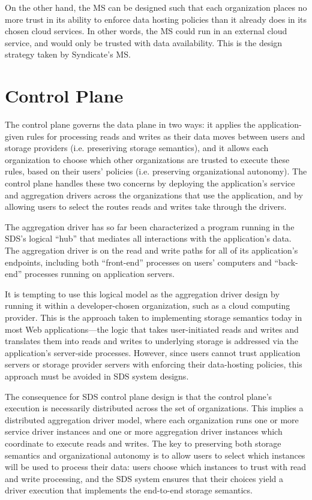 On the other hand, the MS can be designed such that each organization
places no more trust in its ability to enforce data hosting policies
than it already does in its chosen cloud services.  In other words, the
MS could run in an external cloud service, and would only be trusted
with data availability.  This is the design strategy taken by Syndicate's MS.

\section{Control Plane}

The control plane governs the data plane in two ways:  it applies
the application-given rules for processing reads and writes as their data moves
between users and storage providers (i.e. preseriving storage semantics),
and it allows each organization to choose which other organizations
are trusted to execute these rules, based on their users' policies
(i.e. preserving organizational autonomy).
The control plane handles these two concerns by deploying the application's
service and aggregation drivers across the organizations that use the
application, and by allowing users
to select the routes reads and writes take through the drivers.

The aggregation driver has so far been characterized a program running in the 
SDS's logical ``hub''
that mediates all interactions with the application's data.  The aggregation
driver is on the read and write paths for all of its application's endpoints, including
both ``front-end'' processes on users' computers and
``back-end'' processes running on application servers.

It is tempting to use this logical model as the aggregation driver design by
running it within a developer-chosen organization, such as a cloud computing
provider.  This is the approach taken to implementing storage semantics today
in most Web applications---the logic that takes user-initiated reads and writes and
translates them into reads and writes to underlying storage is addressed via
the application's server-side processes.  However, since users cannot trust 
application servers or storage provider servers with
enforcing their data-hosting policies, this approach must be avoided in SDS
system designs.

The consequence for SDS control plane design is that the control plane's
execution is necessarily distributed across the set of organizations.  This
implies a distributed aggregation driver model, where each organization runs
one or more service driver instances and one or more aggregation driver
instances which coordinate to execute reads and writes.
The key to preserving both storage semantics and organizational
autonomy is to allow users to select which instances will be used to process
their data:  users choose which instances to trust with read and write
processing, and the SDS system ensures that their choices yield a driver
execution that implements the end-to-end storage semantics.

